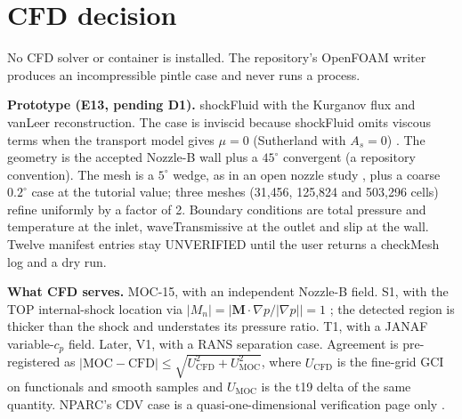 \section{CFD decision}
\label{sec:cfd}
No CFD solver or container is installed. The repository's OpenFOAM writer produces
an incompressible pintle case and never runs a process.
\begingroup\footnotesize
\par{}\addvspace{\LTpost}
\endgroup

\textbf{Prototype (E13, pending D1).} shockFluid with the Kurganov flux and vanLeer
reconstruction. The case is inviscid because shockFluid omits viscous terms when the
transport model gives $\mu=0$ (Sutherland with $A_s=0$) \cite{openfoam13src}. The
geometry is the accepted Nozzle-B wall plus a $45^\circ$ convergent (a repository
convention). The mesh is a $5^\circ$ wedge, as in an open nozzle study
\cite{vandenberghe2024}, plus a coarse $0.2^\circ$ case at the tutorial value; three
meshes (31{,}456, 125{,}824 and 503{,}296 cells) refine uniformly by a factor of 2.
Boundary conditions are total pressure and temperature at the inlet, waveTransmissive at
the outlet and slip at the wall. Twelve manifest entries stay UNVERIFIED until the user returns a checkMesh log and a dry
run.

\textbf{What CFD serves.} MOC-15, with an independent Nozzle-B field. S1, with the TOP
internal-shock location via $|M_n|=|\mathbf{M}\cdot\nabla p/|\nabla p||=1$
\cite[PDF pp.~17--19]{haimes1998}; the detected region is thicker than the shock and
understates its pressure ratio. T1, with a JANAF variable-$c_p$ field. Later, V1, with a
RANS separation case. Agreement is pre-registered as
$|\mathrm{MOC}-\mathrm{CFD}|\le\sqrt{U_{\mathrm{CFD}}^2+U_{\mathrm{MOC}}^2}$, where
$U_{\mathrm{CFD}}$ is the fine-grid GCI on functionals and smooth samples
\cite{celik2008,nparcspatial2021} and $U_{\mathrm{MOC}}$ is the t19 delta of the same
quantity. NPARC's CDV case is a quasi-one-dimensional verification page only
\cite{nparc2021,slater2001}.

